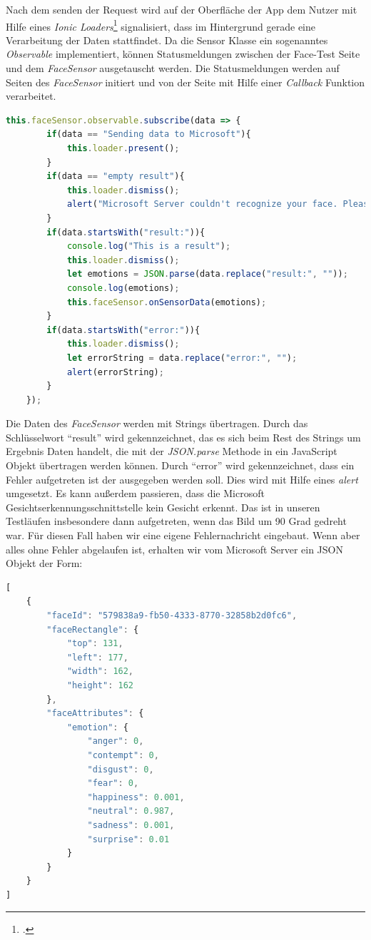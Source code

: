 Nach dem senden der Request wird auf der Oberfläche der App dem Nutzer mit Hilfe eines \textit{Ionic Loaders}\footcite{Ion18f} signalisiert, dass im Hintergrund gerade eine Verarbeitung der Daten stattfindet. Da die Sensor Klasse ein sogenanntes \textit{Observable} implementiert, können Statusmeldungen zwischen der Face-Test Seite und dem \textit{FaceSensor} ausgetauscht werden. Die Statusmeldungen werden auf Seiten des \textit{FaceSensor} initiert und von der Seite mit Hilfe einer \textit{Callback} Funktion verarbeitet.
\begin{lstlisting}[caption={Callback Methode auf FaceSensor Observable}, language=JavaScript]
	this.faceSensor.observable.subscribe(data => {
		if(data == "Sending data to Microsoft"){
			this.loader.present();
		}
		if(data == "empty result"){
			this.loader.dismiss();
			alert("Microsoft Server couldn't recognize your face. Please make sure your face is visible");
		}
		if(data.startsWith("result:")){
			console.log("This is a result");
			this.loader.dismiss();
			let emotions = JSON.parse(data.replace("result:", ""));
			console.log(emotions);
			this.faceSensor.onSensorData(emotions);
		}
		if(data.startsWith("error:")){
			this.loader.dismiss();
			let errorString = data.replace("error:", "");
			alert(errorString);
		}
	});
\end{lstlisting}
Die Daten des \textit{FaceSensor} werden mit Strings übertragen. Durch das Schlüsselwort ``result'' wird gekennzeichnet, das es sich beim Rest des Strings um Ergebnis Daten handelt, die mit der \textit{JSON.parse} Methode in ein JavaScript Objekt übertragen werden können. Durch ``error'' wird gekennzeichnet, dass ein Fehler aufgetreten ist der ausgegeben werden soll. Dies wird mit Hilfe eines \textit{alert} umgesetzt. Es kann außerdem passieren, dass die Microsoft Gesichtserkennungsschnittstelle kein Gesicht erkennt. Das ist in unseren Testläufen insbesondere dann aufgetreten, wenn das Bild um 90 Grad gedreht war. Für diesen Fall haben wir eine eigene Fehlernachricht eingebaut.\newline
Wenn aber alles ohne Fehler abgelaufen ist, erhalten wir vom Microsoft Server ein JSON Objekt der Form:
\begin{lstlisting}[caption={Ergebnis Gesichtserkennungsschnittstelle, Beispiel Microsoft}, language=JavaScript]
[
	{
		"faceId": "579838a9-fb50-4333-8770-32858b2d0fc6",
		"faceRectangle": {
			"top": 131,
			"left": 177,
			"width": 162,
			"height": 162
		},
		"faceAttributes": {
			"emotion": {
				"anger": 0,
				"contempt": 0,
				"disgust": 0,
				"fear": 0,
				"happiness": 0.001,
				"neutral": 0.987,
				"sadness": 0.001,
				"surprise": 0.01
			}
		}
	}
]
\end{lstlisting}
